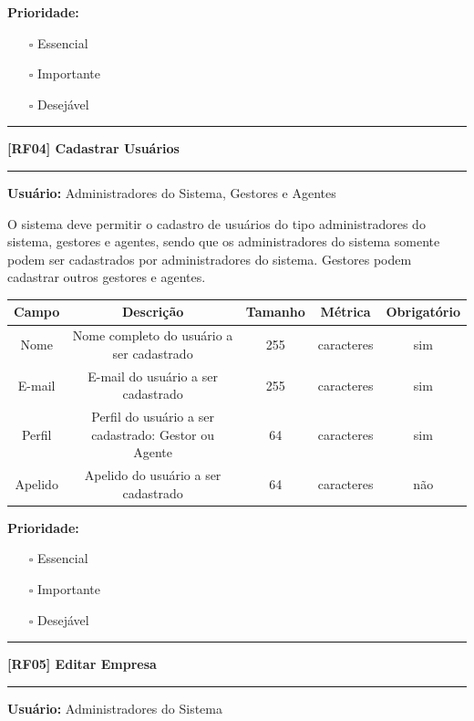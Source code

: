 	\textbf{Prioridade: }\begin{itemize}
		\item[\hspace{1cm}\rlap{\raisebox{0.2ex}{\hspace{0.4ex}\scriptsize \ding{56}}}$\square$]
		Essencial
		\item[\hspace{1cm}$\square$]
		Importante
		\item[\hspace{1cm}$\square$]
		Desejável
	\end{itemize}
	
	\begin{center}
		\noindent\rule{10cm}{0.4pt}
		\textbf{[RF04] Cadastrar Usuários}
		\noindent\rule{10cm}{0.4pt}
	\end{center}
	\textbf{Usuário:} Administradores do Sistema, Gestores e Agentes
	
	O sistema deve permitir o cadastro de usuários do tipo administradores do sistema, gestores e agentes, sendo que os administradores do 
	sistema somente podem ser cadastrados por administradores do sistema. Gestores podem cadastrar outros gestores e agentes.
	
	\begin{center}
		\begin{adjustbox}{width=\textwidth}      \begin{tabular}{ |c|c|c|c|c| } 
			\hline
			\rowcolor{lightgray} Campo & Descrição & Tamanho & Métrica & Obrigatório \\
			\hline
			Nome & Nome completo do usuário a ser cadastrado & 255 & caracteres & sim \\ 
			\hline
			E-mail & E-mail do usuário a ser cadastrado & 255 & caracteres & sim \\ 
			\hline
			Perfil & Perfil do usuário a ser cadastrado: Gestor ou Agente & 64 & caracteres & sim \\ 
			\hline
			Apelido & Apelido do usuário a ser cadastrado & 64 & caracteres & não \\
			\hline
		\end{tabular}    \end{adjustbox}
	\end{center}
	
	\textbf{Prioridade: }\begin{itemize}
		\item[\hspace{1cm}\rlap{\raisebox{0.2ex}{\hspace{0.4ex}\scriptsize \ding{56}}}$\square$]
		Essencial
		\item[\hspace{1cm}$\square$]
		Importante
		\item[\hspace{1cm}$\square$]
		Desejável
	\end{itemize}
	\begin{center}
		\noindent\rule{10cm}{0.4pt}
		\textbf{[RF05] Editar Empresa}
		\noindent\rule{10cm}{0.4pt}
	\end{center}
	\textbf{Usuário:} Administradores do Sistema
	
